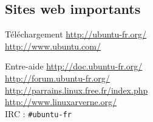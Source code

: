 \documentclass{beamer}
\begin{document}
\subsection{Sites web importants}
\begin{frame}

	\begin{block}{T\'el\'echargement}
	\url{http://ubuntu-fr.org/}\\
	\url{http://www.ubuntu.com/}
	\end{block}
	\begin{block}{Entre-aide}
	\url{http://doc.ubuntu-fr.org/}\\
	\url{http://forum.ubuntu-fr.org/}\\
	\url{http://parrains.linux.free.fr/index.php}\\
	\url{http://www.linuxarverne.org/}\\
	IRC : {\tt \#{}ubuntu-fr}
	\end{block}
\end{frame}
\end{document}
